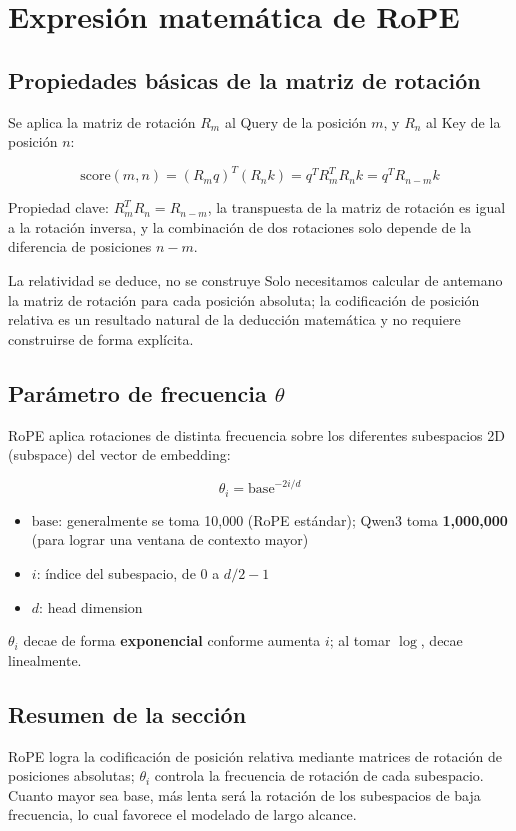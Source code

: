 \section{Expresión matemática de RoPE}

\subsection{Propiedades básicas de la matriz de rotación}

Se aplica la matriz de rotación $R_m$ al Query de la posición $m$, y $R_n$ al Key de la posición $n$:

$$
\text{score}(m, n) = (R_m q)^T (R_n k) = q^T R_m^T R_n k = q^T R_{n-m} k
$$

Propiedad clave: $R_m^T R_n = R_{n-m}$, la transpuesta de la matriz de rotación es igual a la rotación inversa, y la combinación de dos rotaciones solo depende de la diferencia de posiciones $n - m$.

\begin{warningbox}{La relatividad se deduce, no se construye}
Solo necesitamos calcular de antemano la matriz de rotación para cada posición absoluta; la codificación de posición relativa es un resultado natural de la deducción matemática y no requiere construirse de forma explícita.
\end{warningbox}

\subsection{Parámetro de frecuencia $\theta$}

RoPE aplica rotaciones de distinta frecuencia sobre los diferentes subespacios 2D (subspace) del vector de embedding:

$$
\theta_i = \text{base}^{-2i/d}
$$

\begin{itemize}
  \item $\text{base}$: generalmente se toma 10,000 (RoPE estándar); Qwen3 toma \textbf{1,000,000} (para lograr una ventana de contexto mayor)
  \item $i$: índice del subespacio, de 0 a $d/2 - 1$
  \item $d$: head dimension
\end{itemize}

$\theta_i$ decae de forma \textbf{exponencial} conforme aumenta $i$; al tomar $\log$, decae linealmente.

\subsection{Resumen de la sección}

RoPE logra la codificación de posición relativa mediante matrices de rotación de posiciones absolutas; $\theta_i$ controla la frecuencia de rotación de cada subespacio. Cuanto mayor sea base, más lenta será la rotación de los subespacios de baja frecuencia, lo cual favorece el modelado de largo alcance.
